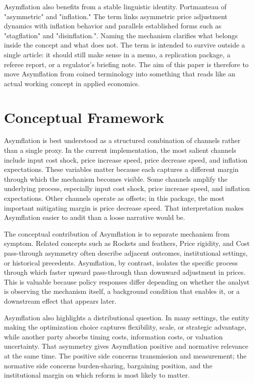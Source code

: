 \documentclass[12pt]{article}
\begin{document}
Asymflation also benefits from a stable linguistic identity. Portmanteau of "asymmetric" and "inflation." The term links asymmetric price adjustment dynamics with inflation behavior and parallels established forms such as "stagflation" and "disinflation.". Naming the mechanism clarifies what belongs inside the concept and what does not. The term is intended to survive outside a single article: it should still make sense in a memo, a replication package, a referee report, or a regulator's briefing note. The aim of this paper is therefore to move Asymflation from coined terminology into something that reads like an actual working concept in applied economics.

\section{Conceptual Framework}
Asymflation is best understood as a structured combination of channels rather than a single proxy. In the current implementation, the most salient channels include input cost shock, price increase speed, price decrease speed, and inflation expectations. These variables matter because each captures a different margin through which the mechanism becomes visible. Some channels amplify the underlying process, especially input cost shock, price increase speed, and inflation expectations. Other channels operate as offsets; in this package, the most important mitigating margin is price decrease speed. That interpretation makes Asymflation easier to audit than a loose narrative would be.

The conceptual contribution of Asymflation is to separate mechanism from symptom. Related concepts such as Rockets and feathers, Price rigidity, and Cost pass-through asymmetry often describe adjacent outcomes, institutional settings, or historical precedents. Asymflation, by contrast, isolates the specific process through which faster upward pass-through than downward adjustment in prices. This is valuable because policy responses differ depending on whether the analyst is observing the mechanism itself, a background condition that enables it, or a downstream effect that appears later.

Asymflation also highlights a distributional question. In many settings, the entity making the optimization choice captures flexibility, scale, or strategic advantage, while another party absorbs timing costs, information costs, or valuation uncertainty. That asymmetry gives Asymflation positive and normative relevance at the same time. The positive side concerns transmission and measurement; the normative side concerns burden-sharing, bargaining position, and the institutional margin on which reform is most likely to matter.
\end{document}
